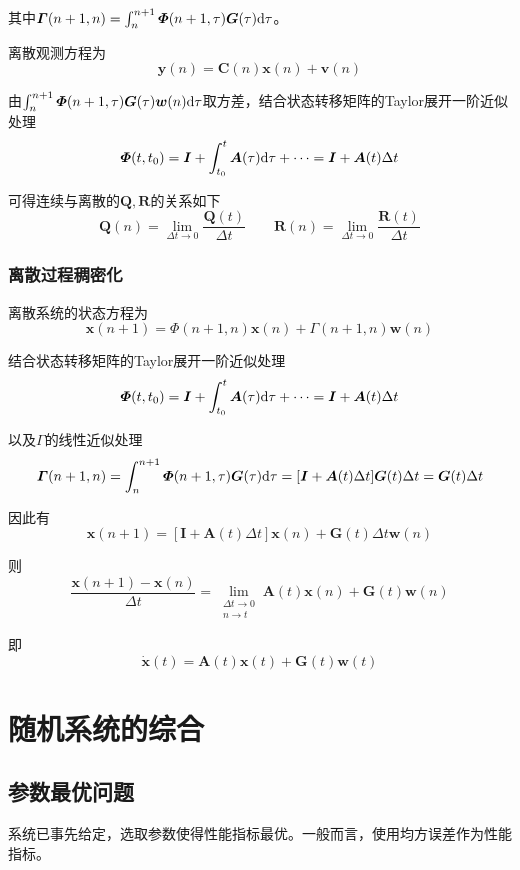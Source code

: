 \documentclass[11pt,a4paper]{ctexart}
\renewcommand{\d}{{\rm d}}
\begin{document}
            其中$\bm\varGamma(n+1,n)=\int_{n}^{n+1}\bm\varPhi(n+1,\tau)\bm G(\tau)\d\tau$。

            离散观测方程为
            \[
            \bm y(n)=\bm C(n)\bm x(n)+\bm v(n)
            \]


            由$\int_{n}^{n+1}\bm\varPhi(n+1,\tau)\bm G(\tau)\bm w(n)\d\tau$取方差，结合状态转移矩阵的Taylor展开一阶近似处理
            \[
            \bm\varPhi(t,t_0)=\bm I+\int_{t_0}^t\bm A(\tau)\d\tau+\cdots=\bm I+\bm A(t)\Delta t
            \]
            
            可得连续与离散的$\bm Q,\bm R$的关系如下
            \[
            \bm Q(n)=\lim\limits_{\Delta t\rightarrow0}\frac{\bm Q(t)}{\Delta t}\qquad
            \bm R(n)=\lim\limits_{\Delta t\rightarrow0}\frac{\bm R(t)}{\Delta t}
            \]
        \subsubsection{离散过程稠密化}
            离散系统的状态方程为
            \[
            \bm{x}(n+1)=\bm{\varPhi}(n+1,n)\bm{x}(n)+\bm{\varGamma}(n+1,n)\bm{w}(n)
            \]
            
            结合状态转移矩阵的Taylor展开一阶近似处理
            \[
            \bm\varPhi(t,t_0)=\bm I+\int_{t_0}^t\bm A(\tau)\d\tau+\cdots=\bm I+\bm A(t)\Delta t
            \]

            以及$\bm\varGamma$的线性近似处理
            \[
            \bm\varGamma(n+1,n)=\int_{n}^{n+1}\bm\varPhi(n+1,\tau)\bm G(\tau)\d\tau=[\bm I+\bm A(t)\Delta t]\bm G(t)\Delta t=\bm G(t)\Delta t
            \]

            因此有
            \[
            \bm x(n+1)=[\bm I+\bm A(t)\Delta t]\bm x(n)+\bm G(t)\Delta t\bm w(n)
            \]

            则
            \[
            \frac{\bm x(n+1)-\bm x(n)}{\Delta t}=\lim\limits_{\substack{\Delta t\rightarrow 0\\n\rightarrow t}}\bm A(t)\bm x(n)+\bm G(t)\bm w(n)
            \]

            即
            \[
            \bm{\dot x}(t)=\bm A(t)\bm x(t)+\bm G(t)\bm w(t)
            \]
\newpage
\section{随机系统的综合}
    \subsection{参数最优问题}
        系统已事先给定，选取参数使得性能指标最优。一般而言，使用均方误差作为性能指标。
\end{document}
